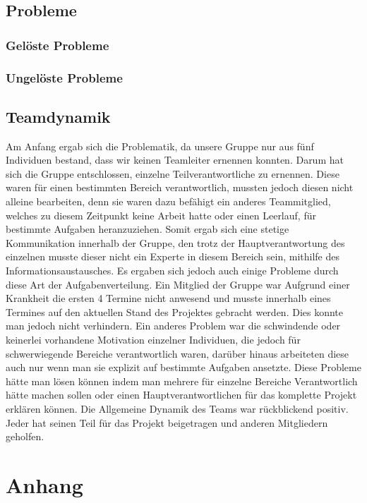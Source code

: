 \documentclass{report}
\begin{document}
\section{Probleme}

\subsection{Gel\"{o}ste Probleme}

\subsection{Ungel\"{o}ste Probleme}

\section{Teamdynamik}

Am Anfang ergab sich die Problematik, da unsere Gruppe nur aus fünf Individuen bestand, dass wir keinen Teamleiter ernennen konnten. Darum hat sich die Gruppe entschlossen, einzelne Teilverantwortliche zu ernennen. Diese waren für einen bestimmten Bereich verantwortlich, mussten jedoch diesen nicht alleine bearbeiten, denn sie waren dazu befähigt ein anderes Teammitglied, welches zu diesem Zeitpunkt keine Arbeit hatte oder einen Leerlauf, für bestimmte Aufgaben heranzuziehen.
Somit ergab sich eine stetige Kommunikation innerhalb der Gruppe, den trotz der Hauptverantwortung des einzelnen musste dieser nicht ein Experte in diesem Bereich sein, mithilfe des Informationsaustausches.
Es ergaben sich jedoch auch einige Probleme durch diese Art der Aufgabenverteilung. Ein Mitglied der Gruppe war Aufgrund einer Krankheit die ersten 4 Termine nicht anwesend und musste innerhalb eines Termines auf den aktuellen Stand des Projektes gebracht werden. Dies konnte man jedoch nicht verhindern. Ein anderes Problem war die schwindende oder keinerlei vorhandene Motivation einzelner Individuen, die jedoch für schwerwiegende Bereiche verantwortlich waren, darüber hinaus arbeiteten diese auch nur wenn man sie explizit auf bestimmte Aufgaben ansetzte. 
Diese Probleme hätte man lösen können indem man mehrere für einzelne Bereiche Verantwortlich hätte machen sollen oder einen Hauptverantwortlichen für das komplette Projekt erklären können.
Die Allgemeine Dynamik des Teams war rückblickend positiv. Jeder hat seinen Teil für das Projekt beigetragen und anderen Mitgliedern geholfen.


\chapter{Anhang}
\end{document}
